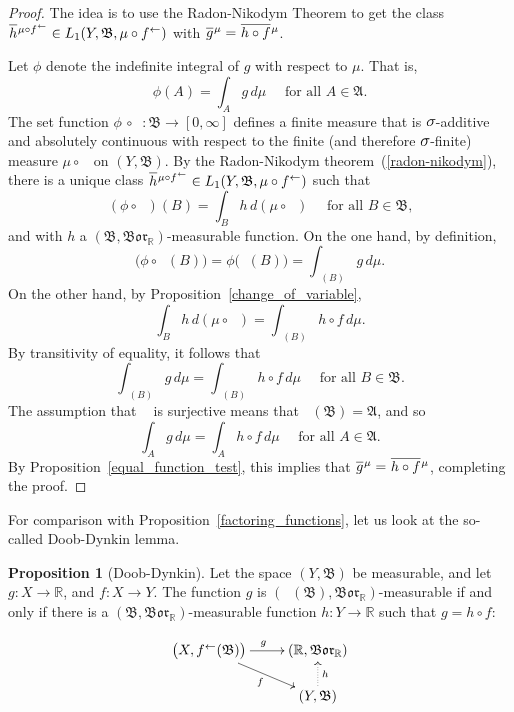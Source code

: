 \documentclass[
twoside=true,
paper=letter,
fontsize=9pt,
pagesize=auto,
leqno,
openany,
headsepline,
overfullrule,
]{scrbook}
\theoremstyle{plain}
\theoremstyle{plain}
\theoremstyle{definition}
\theoremstyle{bfnoteitalic}
\newtheorem{propboldnote}[thm]{Proposition}
\theoremstyle{bfnoteroman}
\newcommand{\sigalg}[1]{\mathfrak{#1}}
\newcommand{\borel}{\mathfrak{Bor}}
\newcommand{\textsigma}{\hbox{\large{$\sigma$}}\kern-1pt}
\newcommand{\preimage}[1]{\mathop{#1^{\leftarrow}}}
\newcommand{\R}{\mathbb{R}}
\newcommand{\sigmaalgebra}{\sigalg{A}}
\newcommand{\sigmaalgebraii}{\sigalg{B}}
\newcommand{\function}{f}
\newcommand{\functionii}{g}
\newcommand{\functioniii}{h}
\newcommand{\measurespace}{X}
\newcommand{\measurespaceii}{Y}
\newcommand{\measure}{\mu}
\newcommand*\xbar[1]{%
   \hbox{%
     \vbox{%
       \hrule height 0.4pt %
       \kern0.4ex%
       \hbox{%
         \ensuremath{#1}%
       }%
     }%
   }%
}
\newcommand{\lebclass}[1]{\hspace{.5pt}\xbar{#1}\hspace{0.5pt}}
\newcommand{\ellclass}[2]{\lebclass{#1}^{#2}}
\begin{document}
\begin{proof}
The idea is to use the Radon-Nikodym Theorem to get the class 
$\ellclass{h}{\measure\circ\preimage{f}}\in L_1 (\measurespaceii, \sigmaalgebraii, \measure\circ\preimage{f})$ with 
$\ellclass{g}{\measure}  
= 
\ellclass{h\circ f}{\measure}$.

Let $\phi$ denote the indefinite integral of $g$ with respect to 
$\measure$. That is,
\[
\phi(A)=\int_A g\,d\measure
\quad\text{ for all $A \in \sigmaalgebra$.}
\]
The set function 
$\phi\, \circ \preimage{f}:\sigmaalgebraii \to [0,\infty]$
defines a finite measure that is $\textsigma$-additive and absolutely continuous with respect to the finite (and therefore $\textsigma$-finite) measure
$\measure\circ\preimage{f}$
on $(\measurespaceii, \sigmaalgebraii)$.
By the Radon-Nikodym theorem~(\ref{radon-nikodym}), there is a unique class
$\ellclass{h}{\measure\circ\preimage{f}}\in L_1(\measurespaceii, \sigmaalgebraii, \measure\circ\preimage{f})$
such that
\[
(\phi\circ\preimage{f}) (B)
=
\int_B h \, d(\measure\circ\preimage{f})
\quad\text{ for all $B\in\sigmaalgebraii$,}
\]
and with $h$ a $(\sigmaalgebraii, \borel_\R)$\hyp{}measurable function.
On the one hand, by definition,
\[
\bigl(\phi\circ\preimage{f} (B)\bigr)
=
\phi\bigl(\preimage{f}(B)\bigr) 
= 
\int_{\preimage{f}(B)} g\, d\measure .
\]
On the other hand, by Proposition~\ref{change_of_variable},
\[
\int_B h \, d(\measure\circ\preimage{f})
=
\int_{\preimage{f}(B)} h\circ f \, d\measure .
\]
By transitivity of equality, it follows that
\[
\int_{\preimage{f}(B)} g\, d\measure
=
\int_{\preimage{f}(B)} h\circ f \, d\measure
\quad\text{ for all $B\in\sigmaalgebraii$.}
\]
The assumption that $\preimage{f}$ is surjective means that
$\preimage{f}(\sigmaalgebraii)=\sigmaalgebra$, and so
\[
\int_{A} g\, d\measure
=
\int_{A} h\circ f \, d\measure
\quad\text{ for all $A\in\sigmaalgebra$.}
\]
By Proposition~\ref{equal_function_test}, this implies that
$\ellclass{g}{\measure}  
= 
\ellclass{h\circ f}{\measure}$,
completing the proof.
\end{proof}


For comparison with Proposition~\ref{factoring_functions}, let us look at the so-called Doob-Dynkin lemma.

\begin{propboldnote}[Doob-Dynkin]\label{doob_dynkin}
Let the space $(\measurespaceii,\sigmaalgebraii)$ be measurable,
and let 
$\functionii:\measurespace\to\R$,
and
$\function:\measurespace\to\measurespaceii$.
The function $\functionii$ is
$(\preimage{\function}(\sigmaalgebraii),\borel_\R)$\hyp{}measurable if and only if there is a 
$(\sigmaalgebraii,\borel_\R)$\hyp{}measurable function
$\functioniii:\measurespaceii\to\R$ such that 
$\functionii=\functioniii\circ\function$:
\end{propboldnote}
\[
\xymatrix@R=16pt{
\bigl(\measurespace,\preimage{\function}(\sigmaalgebraii)\bigr) 
\ar[r]^\functionii
\ar[dr]_\function
& (\R,\borel_\R) \\
 & (\measurespaceii,\sigmaalgebraii) \ar@{.>}[u]_{\functioniii}\\
}
\]
\end{document}
